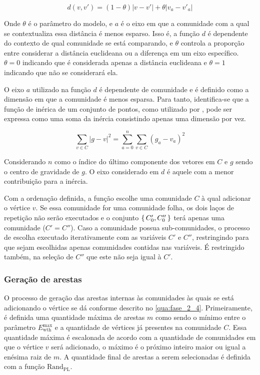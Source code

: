 \documentclass[notes.tex]{subfiles}
\begin{document}
\begin{equation}
d(v, v') = (1-\theta)|v-v'| + \theta|v_a - v'_a|
\end{equation}

Onde $\theta$ é o parâmetro do modelo, e  $a$ é o eixo em que a comunidade com a qual se contextualiza essa distância é menos esparso. 
Isso é, a função $d$ é dependente do contexto de qual comunidade se está comparando, e $\theta$ controla a proporção entre considerar a distância euclideana ou a diferença em um eixo específico.
$\theta = 0$ indicando que é considerada apenas a distância euclideana e $\theta = 1$ indicando que não se considerará ela.

O eixo $a$ utilizado na função $d$ é dependente de comunidade e é definido como a dimensão em que a comunidade é menos esparsa.
Para tanto, identifica-se que a função de inérica de um conjunto de pontos, como utilizado por , pode ser expressa como uma soma da inércia consistindo apenas uma dimensão por vez.

\begin{equation}
\sum_{v \in C} |g-v|^2 = \sum_{a=0}^{n}\sum_{v \in C}(g_a - v_a)^2
\end{equation}

Considerando $n$ como o índice do último componente dos vetores em $C$ e $g$ sendo o centro de gravidade de $g$.
O eixo considerado em $d$ é aquele com a menor contribuição para a inércia.

Com a ordenação definida, a função escolhe uma comunidade $C$ à qual adicionar o vértice $v$.
Se essa comunidade for uma comunidade folha, os dois laços de repetição não serão executados e o conjunto $\set{C'_0, C''_0}$ terá apenas uma comunidade ($C' = C''$).
Caso a comunidade possua sub-comunidades, o processo de escolha executado iterativamente com as variáveis $C'$ e  $C''$, restringindo para que sejam escolhidas apenas comunidades contidas nas variáveis.
É restringido também, na seleção de $C''$ que este não seja igual à  $C'$.

\subsubsection{Geração de arestas}

O processo de geração das arestas internas às comunidades às quais se está adicionando o vértice se dá conforme descrito no \autoref{qua:fase_2_4}.
Primeiramente, é definida uma quantidade máxima de arestas $m$ como sendo o mínimo entre o parâmetro $E_\text{wth}^\text{max}$ e a quantidade de vértices já presentes na comunidade $C$.
Essa quantidade máxima é escalonada de acordo com a quantidade de comunidades em que o vértice $v$ será adicionado, o máximo é o próximo inteiro maior ou igual a enésima raiz de $m$.
A quantidade final de arestas a serem selecionadas é definida com a função $\text{Rand}_\text{PL}$.
\end{document}
